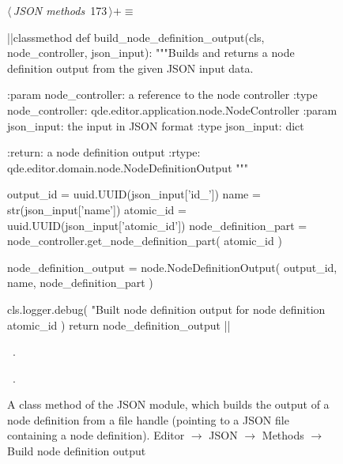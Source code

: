 \documentclass[%
    a4paper,    %
    justified,  %
    nobib,      %
    openany     %
]{tufte-book}
\makeatletter
\renewcommand{\label}[1]{\@tufte@label{##1}}%
\makeatother
\begin{document}
\begin{figure}[!htbp]
\begin{flushleft} \small
\begin{minipage}{\linewidth}\label{scrap143}\raggedright\small
{} $\langle\,${\itshape JSON methods}\nobreak\ {\footnotesize {173}}$\,\rangle+\equiv$
\vspace{-1ex}
\begin{pythoncode}
|\normalfont{}\fontfamily{}|classmethod
def build_node_definition_output(cls, node_controller, json_input):
    """Builds and returns a node definition output from the given
    JSON input data.

    :param node_controller: a reference to the node controller
    :type  node_controller: qde.editor.application.node.NodeController
    :param json_input: the input in JSON format
    :type  json_input: dict

    :return: a node definition output
    :rtype:  qde.editor.domain.node.NodeDefinitionOutput
    """

    output_id             = uuid.UUID(json_input['id_'])
    name                 = str(json_input['name'])
    atomic_id            = uuid.UUID(json_input['atomic_id'])
    node_definition_part = node_controller.get_node_definition_part(
        atomic_id
    )

    node_definition_output = node.NodeDefinitionOutput(
        output_id,
        name,
        node_definition_part
    )

    cls.logger.debug(
        "Built node definition output for node definition %
        atomic_id
    )
    return node_definition_output
|\NWsep|
\end{pythoncode}
\vspace{1.5ex}
\footnotesize
\begin{list}{}{\setlength{\itemsep}{-\parsep}\setlength{\itemindent}{-\leftmargin}}
\item \NWtxtMacroDefBy\ .
\item \NWtxtMacroRefIn\ .

\item{}
\end{list}
\end{minipage}\vspace{4ex}
\end{flushleft}
\caption{A class method of the JSON module, which builds the output of a node
  definition from a file handle (pointing to a JSON file containing a node
  definition).
  \newline{}\newline{}Editor $\rightarrow$ JSON $\rightarrow$
  Methods $\rightarrow$ Build node definition output}
\end{figure}
\end{document}

